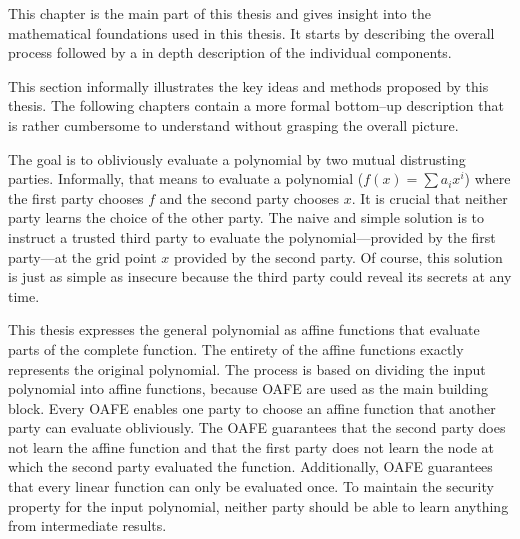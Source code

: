 \label{sec:methods}

This chapter is the main part of this thesis and gives insight into the
mathematical foundations used in this thesis. It starts by describing the
overall process followed by a in depth description of the individual components.

%
%
\label{sec:illustration}

This section informally illustrates the key ideas and methods proposed by this
thesis. The following chapters contain a more formal bottom--up description that
is rather cumbersome to understand without grasping the overall picture.

The goal is to obliviously evaluate a polynomial by two mutual distrusting
parties. Informally, that means to evaluate a polynomial ($f(x) = \sum a_ix^i$)
where the first party chooses $f$ and the second party chooses $x$. It is
crucial that neither party learns the choice of the other party. The naive and
simple solution is to instruct a trusted third party to evaluate the
polynomial---provided by the first party---at the grid point $x$ provided by the
second party. Of course, this solution is just as simple as insecure because the
third party could reveal its secrets at any time.

This thesis expresses the general polynomial as affine functions that evaluate
parts of the complete function. The entirety of the affine functions exactly
represents the original polynomial. The process is based on dividing the input
polynomial into affine functions, because  {OAFE} \cite{davidgoliath} are used as the main building block.
Every OAFE enables one party to choose an affine function that another party can
evaluate obliviously. The OAFE guarantees that the second party does not learn
the affine function and that the first party does not learn the node at which
the second party evaluated the function. Additionally, OAFE guarantees that
every linear function can only be evaluated once. To maintain the security
property for the input polynomial, neither party should be able to learn
anything from intermediate results.

